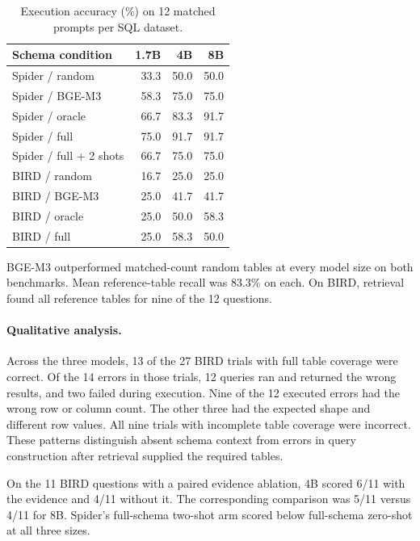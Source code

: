 \documentclass{article}
\begin{document}
\begin{table}[H]
\centering
\caption{Execution accuracy (\%) on 12 matched prompts per SQL dataset.}
\small
\begin{tabular*}{\columnwidth}{@{\extracolsep{\fill}}lrrr@{}}
\toprule
\textbf{Schema condition} & \textbf{1.7B} & \textbf{4B} & \textbf{8B} \\
\midrule
Spider / random & 33.3 & 50.0 & 50.0 \\
Spider / BGE-M3 & 58.3 & 75.0 & 75.0 \\
Spider / oracle & 66.7 & 83.3 & 91.7 \\
Spider / full & 75.0 & 91.7 & 91.7 \\
Spider / full + 2 shots & 66.7 & 75.0 & 75.0 \\
BIRD / random & 16.7 & 25.0 & 25.0 \\
BIRD / BGE-M3 & 25.0 & 41.7 & 41.7 \\
BIRD / oracle & 25.0 & 50.0 & 58.3 \\
BIRD / full & 25.0 & 58.3 & 50.0 \\
\bottomrule
\end{tabular*}
\end{table}

BGE-M3 outperformed matched-count random tables at every model size on both benchmarks. Mean
reference-table recall was 83.3\% on each. On BIRD, retrieval found all reference tables for
nine of the 12 questions.

\paragraph{Qualitative analysis.}

Across the three models, 13 of the 27 BIRD trials with full table coverage were correct. Of
the 14 errors in those trials, 12 queries ran and returned the wrong results, and two failed
during execution. Nine of the 12 executed errors had the wrong row or column count. The other
three had the expected shape and different row values. All nine trials with incomplete table
coverage were incorrect. These patterns distinguish absent schema context from errors in query
construction after retrieval supplied the required tables.

On the 11 BIRD questions with a paired evidence ablation, 4B scored 6/11 with the evidence and 4/11
without it. The corresponding comparison was 5/11 versus 4/11 for 8B. Spider's full-schema two-shot
arm scored below full-schema zero-shot at all three sizes.
\end{document}
